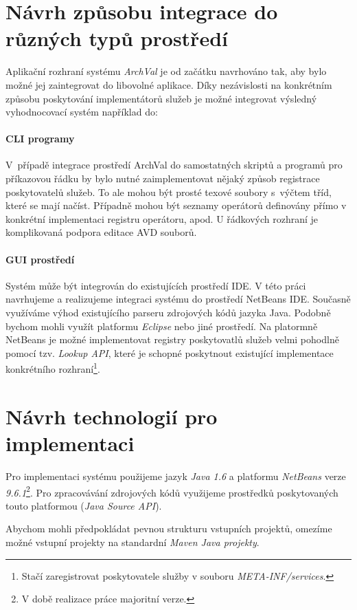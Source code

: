 \section{Návrh způsobu integrace do různých typů prostředí}
Aplikační rozhraní systému \emph{ArchVal} je od začátku navrhováno tak, aby bylo možné jej zaintegrovat do libovolné aplikace. Díky nezávislosti na konkrétním způsobu poskytování implementátorů služeb je možné integrovat výsledný vyhodnocovací systém například do:

\paragraph{CLI programy} V~případě integrace prostředí ArchVal do samostatných skriptů a programů pro příkazovou řádku by bylo nutné zaimplementovat nějaký způsob registrace poskytovatelů služeb. To ale mohou být prosté texové soubory s~výčtem tříd, které se mají načíst. Případně mohou být seznamy operátorů definovány přímo v konkrétní implementaci registru operátoru, apod. U řádkových rozhraní je komplikovaná podpora editace AVD souborů.

\paragraph{GUI prostředí} Systém může být integrován do existujících prostředí IDE. V této práci navrhujeme a realizujeme integraci systému do prostředí NetBeans IDE. Současně využíváme výhod existujícího parseru zdrojových kódů jazyka Java. Podobně bychom mohli využít platformu \emph{Eclipse} nebo jiné prostředí. Na platormně NetBeans je možné implementovat registry poskytovatlů služeb velmi pohodlně pomocí tzv. \emph{Lookup API}, které je schopné poskytnout existující implementace konkrétního rozhraní\footnote{Stačí zaregistrovat poskytovatele služby v souboru \emph{META-INF/services}.}.

\section{Návrh technologií pro implementaci}
Pro implementaci systému použijeme jazyk \emph{Java 1.6} a platformu \emph{NetBeans} verze \emph{9.6.1}\footnote{V době realizace práce majoritní verze.}.  Pro zpracovávání zdrojových kódů využijeme prostředků poskytovaných touto platformou (\emph{Java Source API}).

Abychom mohli předpokládat pevnou strukturu vstupních projektů, omezíme možné vstupní projekty na standardní \emph{Maven Java projekty}.
